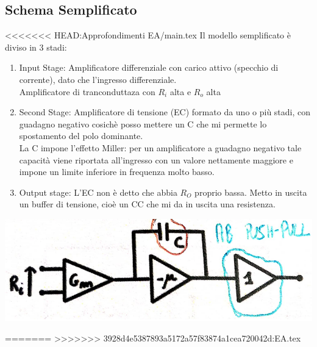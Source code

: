 \documentclass{article}
\begin{document}
\subsection{Schema Semplificato}
<<<<<<< HEAD:Approfondimenti EA/main.tex
Il modello semplificato è diviso in 3 stadi:
\begin{enumerate}
    \item Input Stage: Amplificatore differenziale con carico attivo (specchio di corrente), dato che l'ingresso differenziale.\\
    Amplificatore di tranconduttaza con $R_{i}$ alta e $R_{o}$ alta
    \item Second Stage: Amplificatore di tensione (EC) formato da uno o più stadi, con guadagno negativo cosichè posso mettere un C che mi permette lo spostamento del polo dominante.\\
    La C impone l'effetto Miller: per un amplificatore a guadagno negativo tale capacità viene riportata all’ingresso con un valore nettamente maggiore e impone un limite inferiore in frequenza molto basso.
    \item Output stage: L'EC non è detto che abbia $R_{O}$ proprio bassa. Metto in uscita un buffer di tensione, cioè un CC che mi da in uscita una resistenza.
\end{enumerate}
\vspace{0.3mm}
\begin{center}
    \includegraphics[scale=0.4]{Modello Semplificato.png}
\end{center}
=======
>>>>>>> 3928d4e5387893a5172a57f83874a1cea720042d:EA.tex
\end{document}
